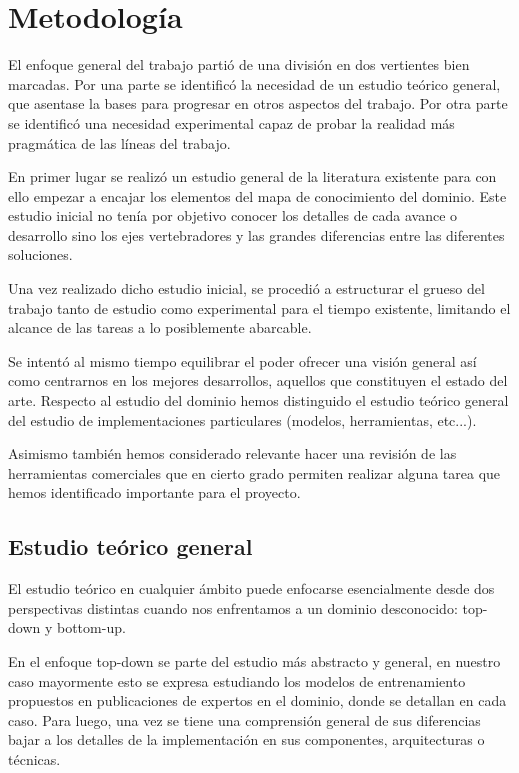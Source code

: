 \section{Metodología}


El enfoque general del trabajo partió de una división en dos vertientes bien marcadas. Por una parte se identificó la necesidad de un estudio teórico general, que asentase la bases para progresar en otros aspectos del trabajo. Por otra parte se identificó una necesidad experimental capaz de probar la realidad más pragmática de las líneas del trabajo.

En primer lugar se realizó un estudio general de la literatura existente para con ello empezar a encajar los elementos del mapa de conocimiento del dominio. Este estudio inicial no tenía por objetivo conocer los detalles de cada avance o desarrollo sino los ejes vertebradores y las grandes diferencias entre las diferentes soluciones.

Una vez realizado dicho estudio inicial, se procedió a estructurar el grueso del trabajo tanto de estudio como experimental para el tiempo existente, limitando el alcance de las tareas a lo posiblemente abarcable.

Se intentó al mismo tiempo equilibrar el poder ofrecer una visión general así como centrarnos en los mejores desarrollos, aquellos que constituyen el estado del arte. Respecto al estudio del dominio hemos distinguido el estudio teórico general del estudio de implementaciones particulares (modelos, herramientas, etc...). 

Asimismo también hemos considerado relevante hacer una revisión de las herramientas comerciales que en cierto grado permiten realizar alguna tarea que hemos identificado importante para el proyecto. 


\subsection{Estudio teórico general}

El estudio teórico en cualquier ámbito puede enfocarse esencialmente desde dos perspectivas distintas cuando nos enfrentamos a un dominio desconocido: top-down y bottom-up.

En el enfoque top-down se parte del estudio más abstracto y general, en nuestro caso mayormente esto se expresa estudiando los modelos de entrenamiento propuestos en publicaciones de expertos en el dominio, donde se detallan en cada caso. Para luego, una vez se tiene una comprensión general de sus diferencias bajar a los detalles de la implementación en sus componentes, arquitecturas o técnicas.


